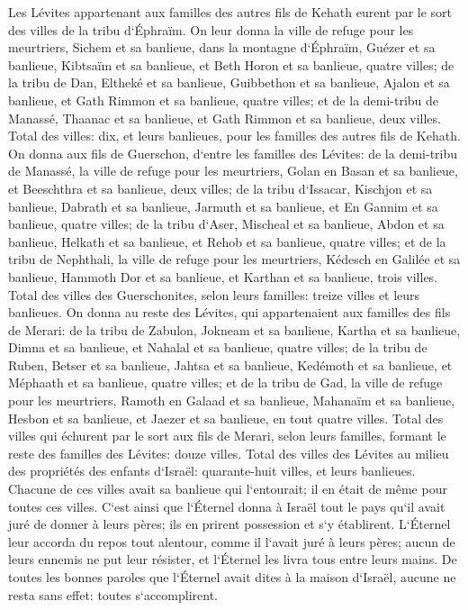 \verse Les Lévites appartenant aux familles des autres fils de Kehath eurent par le sort des villes de la tribu d`Éphraïm. 
\verse On leur donna la ville de refuge pour les meurtriers, Sichem et sa banlieue, dans la montagne d`Éphraïm, Guézer et sa banlieue, 
\verse Kibtsaïm et sa banlieue, et Beth Horon et sa banlieue, quatre villes; 
\verse de la tribu de Dan, Eltheké et sa banlieue, Guibbethon et sa banlieue, 
\verse Ajalon et sa banlieue, et Gath Rimmon et sa banlieue, quatre villes; 
\verse et de la demi-tribu de Manassé, Thaanac et sa banlieue, et Gath Rimmon et sa banlieue, deux villes. 
\verse Total des villes: dix, et leurs banlieues, pour les familles des autres fils de Kehath. 
\verse On donna aux fils de Guerschon, d`entre les familles des Lévites: de la demi-tribu de Manassé, la ville de refuge pour les meurtriers, Golan en Basan et sa banlieue, et Beeschthra et sa banlieue, deux villes; 
\verse de la tribu d`Issacar, Kischjon et sa banlieue, Dabrath et sa banlieue, 
\verse Jarmuth et sa banlieue, et En Gannim et sa banlieue, quatre villes; 
\verse de la tribu d`Aser, Mischeal et sa banlieue, Abdon et sa banlieue, 
\verse Helkath et sa banlieue, et Rehob et sa banlieue, quatre villes; 
\verse et de la tribu de Nephthali, la ville de refuge pour les meurtriers, Kédesch en Galilée et sa banlieue, Hammoth Dor et sa banlieue, et Karthan et sa banlieue, trois villes. 
\verse Total des villes des Guerschonites, selon leurs familles: treize villes et leurs banlieues. 
\verse On donna au reste des Lévites, qui appartenaient aux familles des fils de Merari: de la tribu de Zabulon, Jokneam et sa banlieue, Kartha et sa banlieue, 
\verse Dimna et sa banlieue, et Nahalal et sa banlieue, quatre villes; 
\verse de la tribu de Ruben, Betser et sa banlieue, Jahtsa et sa banlieue, 
\verse Kedémoth et sa banlieue, et Méphaath et sa banlieue, quatre villes; 
\verse et de la tribu de Gad, la ville de refuge pour les meurtriers, Ramoth en Galaad et sa banlieue, Mahanaïm et sa banlieue, 
\verse Hesbon et sa banlieue, et Jaezer et sa banlieue, en tout quatre villes. 
\verse Total des villes qui échurent par le sort aux fils de Merari, selon leurs familles, formant le reste des familles des Lévites: douze villes. 
\verse Total des villes des Lévites au milieu des propriétés des enfants d`Israël: quarante-huit villes, et leurs banlieues. 
\verse Chacune de ces villes avait sa banlieue qui l`entourait; il en était de même pour toutes ces villes. 
\verse C`est ainsi que l`Éternel donna à Israël tout le pays qu`il avait juré de donner à leurs pères; ils en prirent possession et s`y établirent. 
\verse L`Éternel leur accorda du repos tout alentour, comme il l`avait juré à leurs pères; aucun de leurs ennemis ne put leur résister, et l`Éternel les livra tous entre leurs mains. 
\verse De toutes les bonnes paroles que l`Éternel avait dites à la maison d`Israël, aucune ne resta sans effet: toutes s`accomplirent. 

